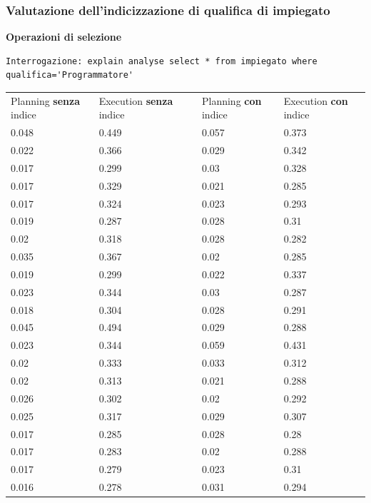 \documentclass{article}
\begin{document}
\subsubsection{Valutazione dell'indicizzazione di qualifica di impiegato}
\textbf{Operazioni di selezione}
\begin{verbatim}
Interrogazione: explain analyse select * from impiegato where qualifica='Programmatore'
\end{verbatim}
\begin{table}[H]
\renewcommand{\arraystretch}{1.1}
\centering
\begin{tabular}{|p{4cm}|p{4cm}|p{0cm}|p{4cm}|p{4cm}|}
\cline{1-5}
Planning \textbf{senza} indice & Execution \textbf{senza} indice & & Planning \textbf{con} indice & Execution \textbf{con} indice \\ \cline{1-5}
0.048 & 0.449 & & 0.057 & 0.373 \\ \cline{1-5}
0.022 & 0.366 & & 0.029 & 0.342 \\ \cline{1-5}
0.017 & 0.299 & & 0.03 & 0.328 \\ \cline{1-5}
0.017 & 0.329 & & 0.021 & 0.285 \\ \cline{1-5}
0.017 & 0.324 & & 0.023 & 0.293 \\ \cline{1-5}
0.019 & 0.287 & & 0.028 & 0.31 \\ \cline{1-5}
0.02 & 0.318 & & 0.028 & 0.282 \\ \cline{1-5}
0.035 & 0.367 & & 0.02 & 0.285 \\ \cline{1-5}
0.019 & 0.299 & & 0.022 & 0.337 \\ \cline{1-5}
0.023 & 0.344 & & 0.03 & 0.287 \\ \cline{1-5}
0.018 & 0.304 & & 0.028 & 0.291 \\ \cline{1-5}
0.045 & 0.494 & & 0.029 & 0.288 \\ \cline{1-5}
0.023 & 0.344 & & 0.059 & 0.431 \\ \cline{1-5}
0.02 & 0.333 & & 0.033 & 0.312 \\ \cline{1-5}
0.02 & 0.313 & & 0.021 & 0.288 \\ \cline{1-5}
0.026 & 0.302 & & 0.02 & 0.292 \\ \cline{1-5}
0.025 & 0.317 & & 0.029 & 0.307 \\ \cline{1-5}
0.017 & 0.285 & & 0.028 & 0.28 \\ \cline{1-5}
0.017 & 0.283 & & 0.02 & 0.288 \\ \cline{1-5}
0.017 & 0.279 & & 0.023 & 0.31 \\ \cline{1-5}
0.016 & 0.278 & & 0.031 & 0.294 \\ \cline{1-5}

\end{tabular}
\end{table}
\end{document}
